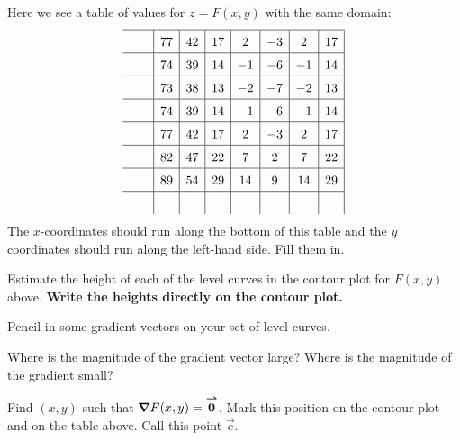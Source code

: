 \documentclass[handout,noauthor,nooutcomes]{ximera}
\begin{document}
\begin{problem}
Here we see a table of values for $z= F(x,y)$ with the same domain:
\[
\renewcommand*{\arraystretch}{1.5}
\begin{array}{c|c|c|c|c|c|c|c|}\hline
\rule{.5cm}{0cm} & 77 & 42 & 17 & 2 & -3 & 2 & 17 \\ \hline
 & 74 & 39 & 14 & -1 & -6 & -1 & 14 \\ \hline
 & 73 & 38 & 13 & -2 & -7 & -2 & 13 \\ \hline
 & 74 & 39 & 14 & -1 & -6 & -1 & 14 \\ \hline
 & 77 & 42 & 17 & 2 & -3 & 2 & 17 \\ \hline
 & 82 & 47 & 22 & 7 & 2 & 7 & 22 \\ \hline
 & 89 & 54 & 29 & 14 & 9 & 14 & 29 \\ \hline
 &    &    &    &    &   &    & 
\end{array}
\]
The $x$-coordinates should run along the bottom of this table and the
$y$ coordinates should run along the left-hand side. Fill them in.
\end{problem}

\begin{problem}
Estimate the height of each of the level curves in the contour plot
for $F(x,y)$ above. \textbf{Write the heights directly on the contour
  plot.}
\end{problem}

\begin{problem}
  Pencil-in some gradient vectors on your set of level curves. 
\end{problem}


\begin{problem}
  Where is the magnitude of the gradient vector large? Where is the
  magnitude of the gradient small?
\end{problem}


\begin{problem}
Find $(x,y)$ such that $\boldsymbol\nabla F(x,y) = {\overset{\boldsymbol{\rightharpoonup}}{\mathbf{0}}}$. Mark this position on the
contour plot and on the table above. Call this point $\vec{c}$.
\end{problem}





\end{document}
